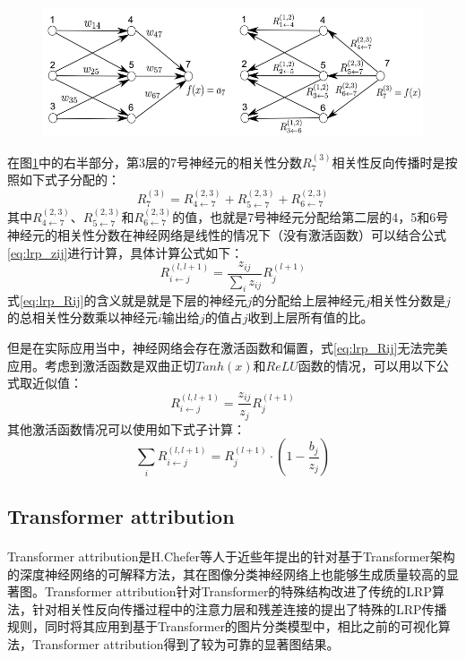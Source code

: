 \begin{figure}[h]
	\centering 
	\includegraphics[width=15cm]{fig/ch2/lrp4.png}
	\label{fig:lrp4}
\end{figure}
在图\ref{fig:lrp4}中的右半部分，第3层的7号神经元的相关性分数$R_{7}^{(3)}$相关性反向传播时是按照如下式子分配的：
\begin{equation}
	R_{7}^{(3)}=R_{4 \leftarrow 7}^{(2,3)}+R_{5 \leftarrow 7}^{(2,3)}+R_{6 \leftarrow 7}^{(2,3)}
\end{equation}
其中$R_{4 \leftarrow 7}^{(2,3)}$、$R_{5 \leftarrow 7}^{(2,3)}$和$R_{6 \leftarrow 7}^{(2,3)}$的值，也就是7号神经元分配给第二层的4，5和6号神经元的相关性分数在神经网络是线性的情况下（没有激活函数）可以结合公式\ref{eq:lrp_zij}进行计算，具体计算公式如下：
\begin{equation}
	R_{i \leftarrow j}^{(l, l+1)}=\frac{z_{i j}}{\sum_{i} z_{i j}} R_{j}^{(l+1)}
	\label{eq:lrp_Rij}
\end{equation}
式\ref{eq:lrp_Rij}的含义就是就是下层的神经元$j$的分配给上层神经元$j$相关性分数是$j$的总相关性分数乘以神经元$i$输出给$j$的值占$j$收到上层所有值的比。

但是在实际应用当中，神经网络会存在激活函数和偏置，式\ref{eq:lrp_Rij}无法完美应用。考虑到激活函数是双曲正切$Tanh(x)$和$ReLU$函数的情况，可以用以下公式取近似值：
\begin{equation}
	R_{i \leftarrow j}^{(l, l+1)}=\frac{z_{i j}}{z_{j}} R_{j}^{(l+1)}
\end{equation}
其他激活函数情况可以使用如下式子计算：
\begin{equation}
	\sum_{i} R_{i \leftarrow j}^{(l, l+1)}=R_{j}^{(l+1)} \cdot\left(1-\frac{b_{j}}{z_{j}}\right)
\end{equation}

\subsection{Transformer attribution}
Transformer attribution是H.Chefer等人\textsuperscript{\cite{chefer2021transformer}}于近些年提出的针对基于Transformer架构的深度神经网络的可解释方法，其在图像分类神经网络上也能够生成质量较高的显著图。Transformer attribution针对Transformer的特殊结构改进了传统的LRP算法，针对相关性反向传播过程中的注意力层和残差连接的提出了特殊的LRP传播规则，同时将其应用到基于Transformer的图片分类模型中，相比之前的可视化算法，Transformer attribution得到了较为可靠的显著图结果。

